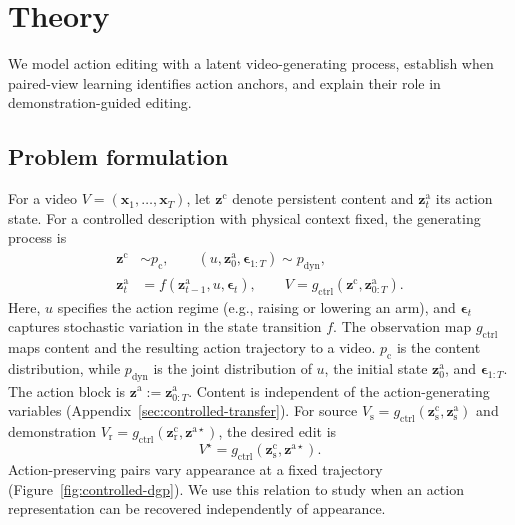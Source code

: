 \section{Theory}
\label{sec:theory}
We model action editing with a latent video-generating process, establish
when paired-view learning identifies action anchors, and explain their role
in demonstration-guided editing.

\subsection{Problem formulation}
\label{subsec:dgp-overview}

For a video $V=(\mathbf x_1,\ldots,\mathbf x_T)$, let $\mathbf z^{\mathrm c}$
denote persistent content and $\mathbf z^{\mathrm a}_t$ its action state.
For a controlled description with physical context fixed, the generating process is
\begin{equation}
 \begin{aligned}
  \mathbf z^{\mathrm c}&\sim p_{\mathrm c},\qquad (u,\mathbf z^{\mathrm a}_0,\boldsymbol\epsilon_{1:T})\sim p_{\mathrm{dyn}},\\
  \mathbf z^{\mathrm a}_t&=f(\mathbf z^{\mathrm a}_{t-1},u,\boldsymbol\epsilon_t),\qquad
  V=g_{\mathrm{ctrl}}(\mathbf z^{\mathrm c},\mathbf z^{\mathrm a}_{0:T}).
 \end{aligned}
 \label{eq:dgp-controlled}
\end{equation}
Here, $u$ specifies the action regime (e.g., raising or lowering an arm),
and $\boldsymbol\epsilon_t$ captures stochastic variation in the state
transition $f$. The observation map $g_{\mathrm{ctrl}}$ maps content and
the resulting action trajectory to a video. $p_{\mathrm c}$ is the content
distribution, while $p_{\mathrm{dyn}}$ is the joint distribution of $u$,
the initial state $\mathbf z^{\mathrm a}_0$, and $\boldsymbol\epsilon_{1:T}$.
The action block is $\mathbf z^{\mathrm a}:=\mathbf z^{\mathrm a}_{0:T}$.
Content is independent of the action-generating variables
(Appendix~\ref{sec:controlled-transfer}). For source
$V_{\mathrm s}=g_{\mathrm{ctrl}}(\mathbf z^{\mathrm c}_{\mathrm s},\mathbf z^{\mathrm a}_{\mathrm s})$ and demonstration
$V_{\mathrm r}=g_{\mathrm{ctrl}}(\mathbf z^{\mathrm c}_{\mathrm r},\mathbf z^{\mathrm a\star})$, the desired edit is
\begin{equation}
 V^\star=g_{\mathrm{ctrl}}(\mathbf z^{\mathrm c}_{\mathrm s},\mathbf z^{\mathrm a\star}).
 \label{eq:dgp-counterfactual}
\end{equation}
Action-preserving pairs vary appearance at a fixed trajectory
(Figure~\ref{fig:controlled-dgp}). We use this relation to study when
an action representation can be recovered independently of appearance.

